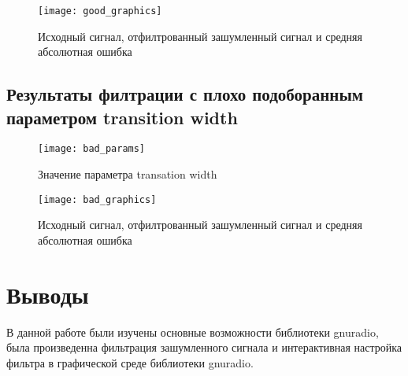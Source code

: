 \begin{figure}[H]
	\begin{center}
		\texttt{[image: good\_graphics]}
		\caption{Исходный сигнал, отфилтрованный зашумленный сигнал и средняя абсолютная ошибка}
		\label{pic:good_graphics} %
	\end{center}
\end{figure}
\newpage

\subsection{Результаты филтрации с плохо подоборанным параметром transition width}
\begin{figure}[H]
	\begin{center}
		\texttt{[image: bad\_params]}
		\caption{Значение параметра transation width}
		\label{pic:bad_params} %
	\end{center}
\end{figure}


\begin{figure}[H]
	\begin{center}
		\texttt{[image: bad\_graphics]}
		\caption{Исходный сигнал, отфилтрованный зашумленный сигнал и средняя абсолютная ошибка}
		\label{pic:bad_graphics} %
	\end{center}
\end{figure}
\newpage


\section{Выводы}

В данной работе были изучены основные возможности библиотеки gnuradio, была произведенна фильтрация зашумленного сигнала и интерактивная настройка фильтра в графической среде библиотеки gnuradio.


